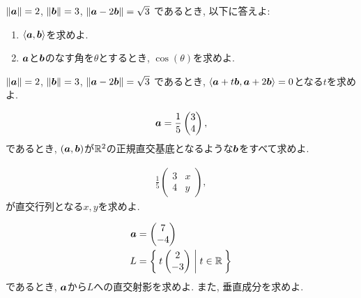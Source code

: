 \begin{quiz}
  \label{quiz:5:7}
  $\|\boldsymbol{a}\|=2$,
  $\|\boldsymbol{b}\|=3$,
  $\|\boldsymbol{a}-2\boldsymbol{b}\|=\sqrt{3}$
  であるとき, 以下に答えよ:
  \begin{enumerate}
  \item $\Braket{\boldsymbol{a},\boldsymbol{b}}$を求めよ.
  \item $\boldsymbol{a}$と$\boldsymbol{b}$のなす角を$\theta$とするとき, $\cos(\theta)$を求めよ.
  \end{enumerate}
\end{quiz}

\begin{quiz}
  \label{quiz:5:6}
  $\|\boldsymbol{a}\|=2$,
  $\|\boldsymbol{b}\|=3$,
  $\|\boldsymbol{a}-2\boldsymbol{b}\|=\sqrt{3}$
  であるとき,
  $\Braket{\boldsymbol{a}+t\boldsymbol{b},\boldsymbol{a}+2\boldsymbol{b}}=0$となる$t$を求めよ.
\end{quiz}





\begin{quiz}
  \begin{align*}
    \boldsymbol{a}=\frac{1}{5}\begin{pmatrix}3\\4\end{pmatrix},
  \end{align*}
  であるとき,
  $(\boldsymbol{a},\boldsymbol{b})$が$\mathbb{R}^2$の正規直交基底となるような$\boldsymbol{b}$をすべて求めよ.
\end{quiz}

\begin{quiz}
  \begin{align*}
    \frac{1}{5}\begin{pmatrix}3&x\\4&y\end{pmatrix},
  \end{align*}
  が直交行列となる$x,y$を求めよ.
\end{quiz}

\begin{quiz}
  \label{quiz:5:p:1}
  \begin{align*}
    \boldsymbol{a}&=\begin{pmatrix}7\\-4\end{pmatrix}\\
    L&=\Set{t\begin{pmatrix}2\\-3\end{pmatrix}|t\in\mathbb{R}}
  \end{align*}
  であるとき,
$\boldsymbol{a}$から$L$への直交射影を求めよ.
また, 垂直成分を求めよ.
\end{quiz}

